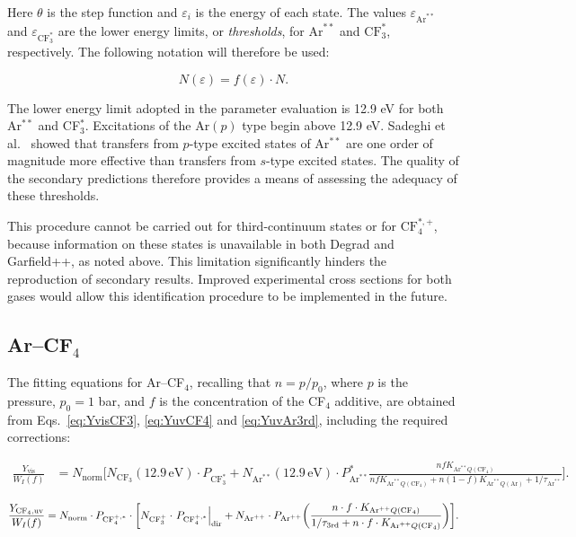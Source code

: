 \documentclass[12pt,a4paper]{article}
\newcommand{\Ar}{\mathrm{Ar}}
\newcommand{\CF}{\mathrm{CF}}
\newcommand{\norma}{\mathrm{norm}}
\newcommand{\vis}{\mathrm{vis}}
\newcommand{\uv}{\mathrm{uv}}
\newcommand{\third}{\mathrm{3rd}}
\newcommand{\dir}{\mathrm{dir}}
\begin{document}
Here $\theta$ is the step function and $\varepsilon_i$ is the energy of each state. The values $\varepsilon_{\Ar^{**}}$ and $\varepsilon_{\CF_3^{*}}$ are the lower energy limits, or \textit{thresholds}, for $\Ar^{**}$ and $\CF_3^{*}$, respectively. The following notation will therefore be used:

\begin{equation}
    N(\varepsilon) = f (\varepsilon) \cdot N.
\end{equation}

The lower energy limit adopted in the parameter evaluation is 12.9 eV for both Ar$^{**}$ and CF$_3^{*}$. Excitations of the $\Ar(p)$ type begin above 12.9 eV. Sadeghi et al.\ \cite{Sadeghi} showed that transfers from $p$-type excited states of Ar$^{**}$ are one order of magnitude more effective than transfers from $s$-type excited states. The quality of the secondary predictions therefore provides a means of assessing the adequacy of these thresholds.

This procedure cannot be carried out for third-continuum states or for $\CF_4^{*,+}$, because information on these states is unavailable in both Degrad and Garfield++, as noted above. This limitation significantly hinders the reproduction of secondary results. Improved experimental cross sections for both gases would allow this identification procedure to be implemented in the future.

\subsection{Ar--CF$_4$}

The fitting equations for Ar--CF$_4$, recalling that $n=p/p_0$, where $p$ is the pressure, $p_0=1$ bar, and $f$ is the concentration of the CF$_4$ additive, are obtained from Eqs.~\ref{eq:YvisCF3}, \ref{eq:YuvCF4} and \ref{eq:YuvAr3rd}, including the required corrections:

{\small
\begin{equation*}
\begin{aligned}
\frac{Y_{\vis}}{W_I(f)}
&=
N_{\norma} \Bigg[
N_{\CF_3}(12.9\,\mathrm{eV})  \cdot P_{\CF_3^*}
+
N_{\Ar^{**}}(12.9\,\mathrm{eV}) \cdot P_{\Ar^{**}}^*
\frac{
n f K_{\Ar^{**}Q(\CF_4)}
}{
n f K_{\Ar^{**}Q(\CF_4)}
+
n(1-f)K_{\Ar^{**}Q(\Ar)}
+
1/\tau_{\Ar^{**}}
} \Bigg].
\end{aligned}
\end{equation*}
}

\begin{equation*}
    \frac{Y_{\CF_4,\uv}}{W_I(f)}
    =
    {N_{\norma}}
    \cdot
    P_{\CF_4^{+,*}}
    \cdot
    \bqty{
      N_{\CF_3^+}\cdot \left. P_{\CF_4^{+,*}} \right|_{\dir}
      +
      N_{\Ar^{++}}\cdot P_{\Ar^{++}}
      \pqty{
        \frac{n \cdot f \cdot K_{\Ar^{++}Q(\CF_4)}}{
        1/\tau_{\third} + n \cdot f \cdot K_{\Ar^{++}Q(\CF_4)}}
      }
    }.
\end{equation*}
\end{document}
